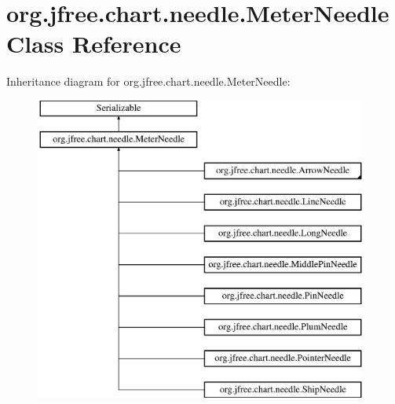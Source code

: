 \hypertarget{classorg_1_1jfree_1_1chart_1_1needle_1_1_meter_needle}{}\section{org.\+jfree.\+chart.\+needle.\+Meter\+Needle Class Reference}
\label{classorg_1_1jfree_1_1chart_1_1needle_1_1_meter_needle}
Inheritance diagram for org.\+jfree.\+chart.\+needle.\+Meter\+Needle\+:\begin{figure}[H]
\begin{center}
\leavevmode
\includegraphics[height=10.000000cm]{classorg_1_1jfree_1_1chart_1_1needle_1_1_meter_needle}
\end{center}
\end{figure}
